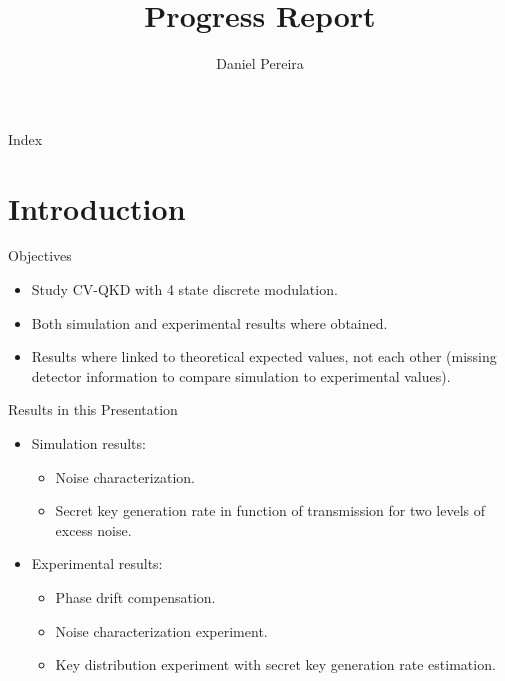 \documentclass{beamer}
\title{Progress Report}
\date
\author{Daniel Pereira}
\institute[Instituto de Telecomunições] %
\date
\begin{document}
\begin{frame}
  \titlepage
\end{frame}

\begin{frame}{Index}
  \tableofcontents
\end{frame}



\section{Introduction}
\begin{frame}[t]{Objectives}
\begin{itemize}
\item Study CV-QKD with 4 state discrete modulation.
\item Both simulation and experimental results where obtained.
\item Results where linked to theoretical expected values, not each other (missing detector information to compare simulation to experimental values).
\end{itemize}
\end{frame}

\begin{frame}[t]{Results in this Presentation}
\begin{itemize}
\item Simulation results:
\begin{itemize}
\item Noise characterization.
\item Secret key generation rate in function of transmission for two levels of excess noise.
\end{itemize}
\item Experimental results:
\begin{itemize}
\item Phase drift compensation.
\item Noise characterization experiment.
\item Key distribution experiment with secret key generation rate estimation.
\end{itemize}
\end{itemize}
\end{frame}
\end{document}
